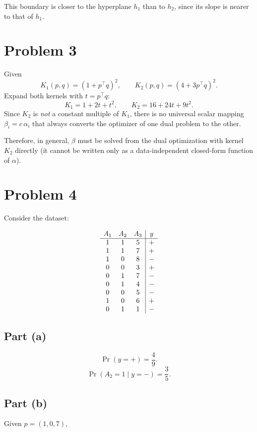 \documentclass[fleqn]{article}
\begin{document}
    \medskip
    \noindent This boundary is closer to the hyperplane $h_1$ than to $h_2$, since its slope is nearer to that of $h_1$.

    \newpage
    \section{Problem 3}
    Given
    \[
        K_1(p,q)=(1+p^\top q)^2,\qquad
        K_2(p,q)=(4+3p^\top q)^2.
    \]
    Expand both kernels with $t=p^\top q$:
    \[
        K_1=1+2t+t^2,\qquad
        K_2=16+24t+9t^2.
    \]
    Since $K_2$ is \emph{not} a constant multiple of $K_1$, there is no universal scalar mapping
    $\beta_i=c\,\alpha_i$ that always converts the optimizer of one dual problem to the other.

    \medskip
    \noindent Therefore, in general, $\beta$ must be solved from the dual optimization with kernel $K_2$ directly (it cannot be written only as a data-independent closed-form function of $\alpha$).


    \section{Problem 4}
    Consider the dataset:

    \[
    \begin{array}{c c c | c}
        A_1 & A_2 & A_3 & y\\
        \hline
        1 & 1 & 5 & +\\
        1 & 1 & 7 & +\\
        1 & 0 & 8 & -\\
        0 & 0 & 3 & +\\
        0 & 1 & 7 & -\\
        0 & 1 & 4 & -\\
        0 & 0 & 5 & -\\
        1 & 0 & 6 & +\\
        0 & 1 & 1 & -
    \end{array}
    \]

    \subsection{Part (a)}
     \[
        \Pr(y=+)=\frac{4}{9}.
    \]
    \[
        \Pr(A_2=1\mid y=-)=\frac{3}{5}.
    \]

    \subsection{Part (b)}
    Given $p=(1,0,7)$,
    
\end{document}
